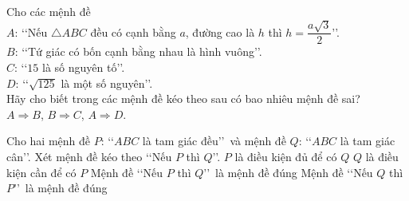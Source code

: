\begin{bt}%
	Cho  các mệnh đề\\
	$A$: \lq\lq Nếu  $\triangle ABC$ đều có cạnh bằng $a$, đường cao là $h$ thì $h = \dfrac{a\sqrt{3}}{2}$\rq\rq.\\
	$B$: \lq\lq Tứ giác có bốn cạnh bằng  nhau là hình vuông\rq\rq.\\
	$C$:  \lq\lq $15$ là số nguyên tố\rq\rq.\\
	$D$: \lq\lq $\sqrt{125}$ là một số  nguyên\rq\rq.\\
	Hãy cho biết trong các mệnh đề kéo theo sau có bao  nhiêu mệnh đề sai?\\
	$A \Rightarrow B$, $B \Rightarrow C$, $A \Rightarrow  D$.
\end{bt}

\begin{ex}%
	Cho hai mệnh đề $P$: \lq\lq $ABC$ là tam giác đều\rq\rq\ và mệnh đề $Q$: \lq\lq $ABC$ là  tam giác cân\rq\rq.
	Xét mệnh đề kéo theo \lq\lq Nếu $P$  thì $Q$\rq\rq.
	\choiceTF 
		{\True $P$ là điều kiện  đủ để có $Q$}
		{\True $Q$ là điều kiện cần để  có $P$}
		{\True Mệnh đề  \lq\lq Nếu $P$ thì $Q$\rq\rq\ là mệnh đề đúng}
		 {Mệnh đề \lq\lq Nếu $Q$ thì $P$\rq\rq\ là mệnh đề đúng}
\end{ex}

